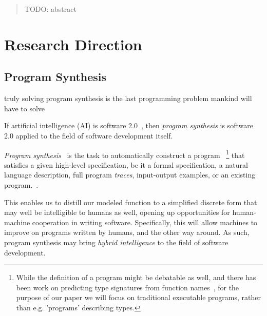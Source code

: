 \documentclass{article}
\begin{document}


\tableofcontents

\pagebreak

\begin{abstract}
    TODO: abstract
\end{abstract}

\section{Research Direction} %

\subsection{Program Synthesis}

\begin{displayquote}
    truly solving program synthesis is the last programming problem mankind will have to solve~\citep{nps}
\end{displayquote}

\begin{displayquote}
    If artificial intelligence (AI) is software 2.0~\citep{software20},
    then \emph{program synthesis} is software 2.0 applied to the field of software development itself.
\end{displayquote}


\emph{Program synthesis}~\citep{church1957applications} is the task to automatically construct a program%
~\footnote{
    While the definition of a program might be debatable as well,
    and there has been work on predicting type signatures from function names~\citep{wang2018predicting},
    for the purpose of our paper we will focus on traditional executable programs,
    rather than e.g. 'programs' describing types.
}%
that satisfies a given high-level specification,
be it a formal specification, a natural language description,
full program \emph{traces}, input-output examples,
or an existing program.~\citep{gulwani2017program}.

This enables us to distill our modeled function
to a simplified discrete form that may well be intelligible to humans as well,
opening up opportunities for human-machine cooperation in writing software.
Specifically, this will allow machines to improve on programs written by humans, and the other way around.
As such, program synthesis may bring \emph{hybrid intelligence} to the field of software development.
\end{document}
